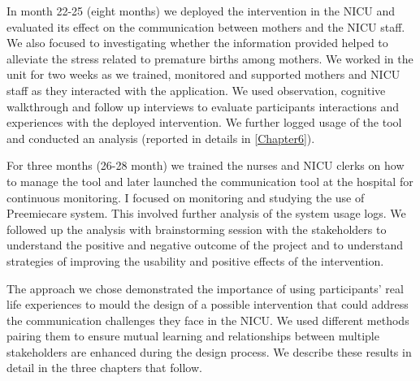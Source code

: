 In month 22-25 (eight months) we deployed the intervention in the NICU and evaluated its effect on  the communication between mothers and the NICU staff. We also focused to investigating whether the information provided helped to alleviate the stress related to premature births among mothers. We worked in the unit for two weeks as we trained, monitored and supported mothers and NICU staff as they interacted with the application. We used observation, cognitive walkthrough and follow up interviews to evaluate participants interactions and experiences with the deployed intervention. We  further logged usage of the tool and conducted an analysis (reported in details in \ref{Chapter6}).

For three months (26-28 month) we trained the nurses and NICU clerks on how to manage the tool and later launched the communication tool at the hospital for continuous monitoring. I focused on monitoring and studying the use of Preemiecare system. This involved further analysis of the system usage logs. We followed up the analysis with brainstorming session with the stakeholders to understand the positive and negative outcome of the project and to understand strategies of improving the usability and positive effects of the intervention.

The approach we chose demonstrated the importance of using participants' real life experiences to mould the design of a possible intervention that could address the communication challenges they face in the NICU. We used different methods pairing them to ensure mutual learning and relationships between multiple stakeholders are enhanced during the  design process. We describe these results in detail in the three chapters that follow.


